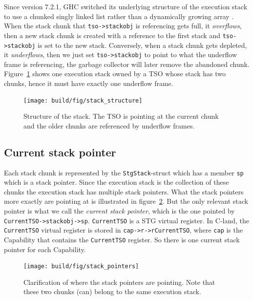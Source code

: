 Since version 7.2.1, GHC switched its underlying structure of the
execution stack to use a chunked singly linked list rather than a
dynamically growing array
\cite{ghc_blog_overhaul_of_stack_management, ghc_changeset_stack_chunks}. When the stack chunk that
\texttt{tso->stackobj} is referencing gets full, it \emph{overflows},
then a new stack chunk is created with a reference to the first stack
and \texttt{tso->stackobj} is set to the new stack. Conversely, when
a stack chunk gets depleted, it \emph{underflows}, then we just
set \texttt{tso->stackobj} to point to what the underflow frame is
referencing, the garbage collector will later remove the abandoned
chunk. Figure~\ref{fig:stack_structure} shows one execution stack
owned by a TSO whose stack has two chunks, hence it must have exactly
one underflow frame.

\begin{figure}
\begin{mdframed}
  \texttt{[image: build/fig/stack\_structure]}
  \caption{Structure of the stack. The TSO is pointing at the current
  chunk and the older chunks are referenced by underflow frames.}
  \label{fig:stack_structure}
\end{mdframed}
\end{figure}

\subsection{Current stack pointer}

Each stack chunk is represented by the \texttt{StgStack}-struct
which has a member \texttt{sp} which is a stack pointer.
Since the execution stack is the collection of these chunks the
execution stack has multiple stack pointers. What the stack
pointers more exactly are pointing at is illustrated in figure~\ref{fig:stack_pointers}. But the only relevant stack pointer is what
we call the \emph{current stack pointer}, which is the one pointed by
\texttt{CurrentTSO->stackobj->sp}. \texttt{CurrentTSO} is a STG virtual
register. In C-land, the \texttt{CurrentTSO} virtual register is stored
in \texttt{cap->r->rCurrentTSO}, where \texttt{cap} is the Capability
that contains the \texttt{CurrentTSO} register. So there is one current
stack pointer for each Capability.

\begin{figure}
\begin{mdframed}
  \texttt{[image: build/fig/stack\_pointers]}
  \caption{Clarification of where the stack pointers are pointing. Note
that these two chunks (can) belong to the same execution stack.}
  \label{fig:stack_pointers}
\end{mdframed}
\end{figure}

